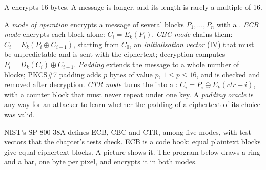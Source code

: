 A  encrypts 16 bytes. A message is longer, and its length is rarely a multiple of 16.

\begin{definition}\label{def:b3:symmetric-cryptography:modes}
A \emph{mode of operation} encrypts a message of several blocks $P_1, \ldots, P_n$ with a . \emph{ECB mode} encrypts each block alone: $C_i = E_k(P_i)$. \emph{CBC mode} chains them: $C_i = E_k(P_i \oplus C_{i-1})$, starting from $C_0$, an \emph{initialisation vector} (IV) that must be unpredictable and is sent with the ciphertext; decryption computes $P_i = D_k(C_i) \oplus C_{i-1}$. \emph{Padding} extends the message to a whole number of blocks; PKCS\#7 padding adds $p$ bytes of value $p$, $1 \le p \le 16$, and is checked and removed after decryption. \emph{CTR mode} turns the  into a : $C_i = P_i \oplus E_k(\mathit{ctr} + i)$, with a counter block that must never repeat under one key. A \emph{padding oracle} is any way for an attacker to learn whether the padding of a ciphertext of its choice was valid. %
\end{definition}

NIST's SP 800-38A defines ECB, CBC and CTR, among five modes, with test vectors that the chapter's tests check. %
ECB is a code book: equal plaintext blocks give equal ciphertext blocks. A picture shows it. The program below draws a ring and a bar, one byte per pixel, and encrypts it in both modes.

\label{out:b3:symmetric-cryptography:ecb}

